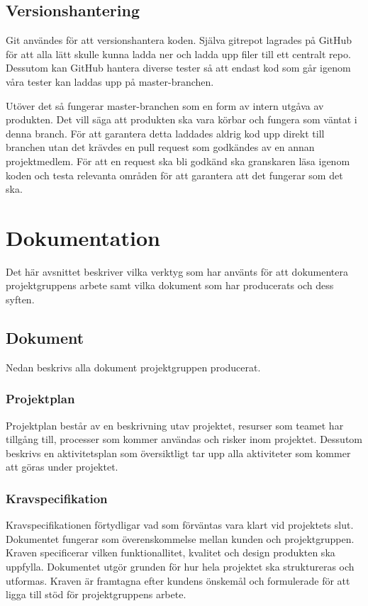 \subsection{Versionshantering}
Git användes för att versionshantera koden. Själva gitrepot lagrades på GitHub för att alla lätt skulle kunna ladda ner och ladda upp filer till ett centralt repo. Dessutom kan GitHub hantera diverse tester så att endast kod som går igenom våra tester kan laddas upp på master-branchen.

Utöver det så fungerar master-branchen som en form av intern utgåva av produkten. Det vill säga att produkten ska vara körbar och fungera som väntat i denna branch. För att garantera detta laddades aldrig kod upp direkt till branchen utan det krävdes en pull request som godkändes av en annan projektmedlem. För att en request ska bli godkänd ska granskaren läsa igenom koden och testa relevanta områden för att garantera att det fungerar som det ska.

\section{Dokumentation}
\label{sec:method-documentation}
Det här avsnittet beskriver vilka verktyg som har använts för att dokumentera projektgruppens arbete samt vilka dokument som har producerats och dess syften.

\subsection{Dokument}
Nedan beskrivs alla dokument projektgruppen producerat.

\subsubsection*{Projektplan}
Projektplan består av en beskrivning utav projektet, resurser som teamet har tillgång till, processer som kommer användas och risker inom projektet.
Dessutom beskrivs en aktivitetsplan som översiktligt tar upp alla aktiviteter som kommer att
göras under projektet.

\subsubsection*{Kravspecifikation}
Kravspecifikationen förtydligar vad som förväntas vara klart vid projektets slut. Dokumentet fungerar som överenskommelse mellan kunden och projektgruppen. Kraven specificerar vilken funktionallitet, kvalitet och design produkten ska uppfylla. Dokumentet utgör grunden för hur hela projektet ska struktureras och utformas. Kraven är framtagna efter kundens önskemål och formulerade för att ligga till stöd för projektgruppens arbete.

